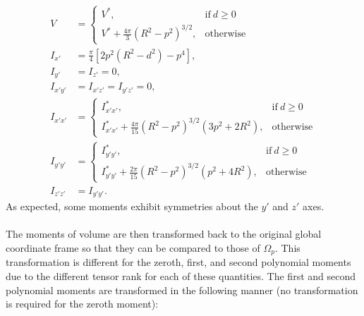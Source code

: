 \begin{align} 
V &=  \begin{cases}
      V^*, & \text{if}\ d \geq 0 \\
      V^* + \frac{4\pi}{3}\left(R^2-p^2\right)^{3/2}, & \text{otherwise}
    \end{cases}\\
I_{x'} &= \frac{\pi}{4}\left[2p^2(R^2-d^2) - p^4 \right],\\
I_{y'} &= I_{z'} = 0, \\
I_{x'y'} &= I_{x'z'} = I_{y'z'} = 0, \\
I_{x'x'} &=  \begin{cases}
      I^*_{x'x'}, & \text{if}\ d \geq 0 \\
       I^*_{x'x'} + \frac{4\pi}{15}(R^2-p^2)^{3/2}(3p^2+2R^2), & \text{otherwise}
    \end{cases} \\
I_{y'y'} &=  \begin{cases}
     I^*_{y'y'}, & \text{if}\ d \geq 0 \\
     I^*_{y'y'} + \frac{2\pi}{15}(R^2-p^2)^{3/2}(p^2+4R^2), & \text{otherwise}
    \end{cases} \\
I_{z'z'} &= I_{y'y'}.
\end{align}
As expected, some moments exhibit symmetries about the $y'$ and $z'$ axes. \\ \\
%
The moments of volume are then transformed back to the original global coordinate frame so that they can be compared to those of $\Omega_p$. This transformation is different for the zeroth, first, and second polynomial moments due to the different tensor rank for each of these quantities. The first and second polynomial moments are transformed in the following manner (no transformation is required for the zeroth moment):
